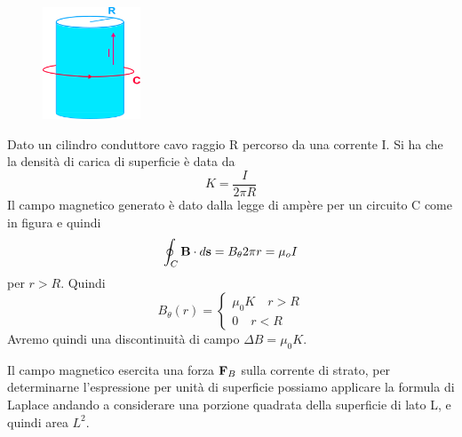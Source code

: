 \begin{figure}  %
    \centering
    \includegraphics[width=0.26\textwidth]{images/pressionemagneto}  %
\end{figure}
Dato un cilindro conduttore cavo raggio R percorso da una corrente I. Si ha che la densit\`a di carica di superficie \`e data da 
\begin{equation*}
	K = \frac{I}{2 \pi R}
\end{equation*}
Il campo magnetico generato \`e dato dalla legge di amp\`ere per un circuito C come in figura e quindi
\begin{equation*}
	\oint_{C} \bold{B} \cdot d\bold{s} = B_{\theta} 2 \pi r = \mu_o I 
\end{equation*} 
per $r > R$. Quindi 
\begin{equation*}
	B_{\theta}(r)  = \left \{ \begin{array}{l}
	\mu_0 K \quad r > R \\[0.2cm]
	0 \quad r<R
	\end{array}\right.
\end{equation*}
Avremo quindi una discontinuit\`a di campo $\Delta B = \mu_0K$.

Il campo magnetico esercita una forza $\bold{F}_B$ sulla corrente di strato, per determinarne l'espressione per unit\`a di superficie possiamo applicare la formula di Laplace andando a considerare una porzione quadrata della superficie di lato L, e quindi area $L^2$.



